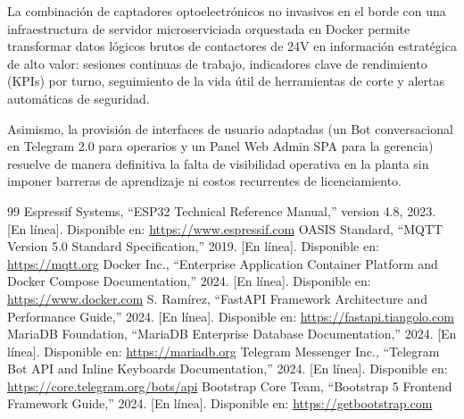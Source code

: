 \documentclass[11pt,a4paper]{article}
\begin{document}
La combinación de captadores optoelectrónicos no invasivos en el borde con una infraestructura de servidor microserviciada orquestada en Docker permite transformar datos lógicos brutos de contactores de 24V en información estratégica de alto valor: sesiones continuas de trabajo, indicadores clave de rendimiento (KPIs) por turno, seguimiento de la vida útil de herramientas de corte y alertas automáticas de seguridad.

Asimismo, la provisión de interfaces de usuario adaptadas (un Bot conversacional en Telegram 2.0 para operarios y un Panel Web Admin SPA para la gerencia) resuelve de manera definitiva la falta de visibilidad operativa en la planta sin imponer barreras de aprendizaje ni costos recurrentes de licenciamiento.

\begin{thebibliography}{99}
 Espressif Systems, ``ESP32 Technical Reference Manual,'' version 4.8, 2023. [En línea]. Disponible en: \url{https://www.espressif.com}
 OASIS Standard, ``MQTT Version 5.0 Standard Specification,'' 2019. [En línea]. Disponible en: \url{https://mqtt.org}
 Docker Inc., ``Enterprise Application Container Platform and Docker Compose Documentation,'' 2024. [En línea]. Disponible en: \url{https://www.docker.com}
 S. Ramírez, ``FastAPI Framework Architecture and Performance Guide,'' 2024. [En línea]. Disponible en: \url{https://fastapi.tiangolo.com}
 MariaDB Foundation, ``MariaDB Enterprise Database Documentation,'' 2024. [En línea]. Disponible en: \url{https://mariadb.org}
 Telegram Messenger Inc., ``Telegram Bot API and Inline Keyboards Documentation,'' 2024. [En línea]. Disponible en: \url{https://core.telegram.org/bots/api}
 Bootstrap Core Team, ``Bootstrap 5 Frontend Framework Guide,'' 2024. [En línea]. Disponible en: \url{https://getbootstrap.com}
\end{thebibliography}
\end{document}
